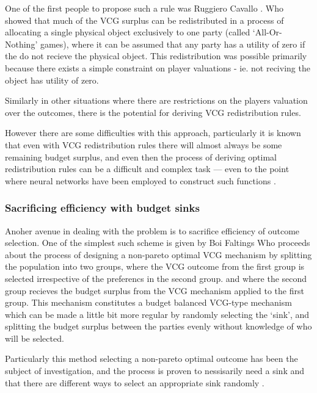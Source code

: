 One of the first people to propose such a rule was Ruggiero Cavallo \cite{Cavallo:2006:ODM:1160633.1160790}.%
Who showed that much of the VCG surplus can be redistributed in a process of allocating a single physical object exclusively to one party (called `All-Or-Nothing' games), where it can be assumed that any party has a utility of zero if the do not recieve the physical object.
This redistribution was possible primarily because there exists a simple constraint on player valuations - ie. not reciving the object has utility of zero.

Similarly in other situations where there are restrictions on the players valuation over the outcomes, there is the potential for deriving VCG redistribution rules.

However there are some difficulties with this approach, particularly it is known that even with VCG redistribution rules there will almost always be some remaining budget surplus, and even then the process of deriving optimal redistribution rules can be a difficult and complex task --- even to the point where neural networks have been employed to construct such functions \cite{DBLP:conf/atal/ManishaJG18}.

\subsubsection*{Sacrificing efficiency with budget sinks}

Anoher avenue in dealing with the problem is to sacrifice efficiency of outcome selection.
One of the simplest such scheme is given by Boi Faltings \cite{10.1007/978-3-642-25510-6_14, 10.1007/978-3-642-25510-6_14}
Who proceeds about the process of designing a non-pareto optimal VCG mechanism by splitting the population into two groups, where the VCG outcome from the first group is selected irrespective of the preferencs in the second group.
and where the second group recieves the budget surplus from the VCG mechanism applied to the first group.
This mechanism constitutes a budget balanced VCG-type mechanism which can be made a little bit more regular by randomly selecting the `sink', and splitting the budget surplus between the parties evenly without knowledge of who will be selected.\cite{10.1007/978-3-642-25510-6_14}

Particularly this method selecting a non-pareto optimal outcome has been the subject of investigation, and the process is proven to nessisarily need a sink and that there are different ways to select an appropriate sink randomly \cite{NATH2019673}.



